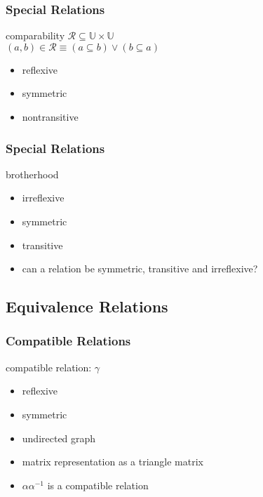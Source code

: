 \documentclass[dvipsnames]{beamer}
\begin{document}
\begin{frame}
  \frametitle{Special Relations}

  \begin{block}{comparability}
    $\mathcal{R} \subseteq \mathbb{U} \times \mathbb{U}$\\
    $(a,b) \in \mathcal{R} \equiv (a \subseteq b) \vee (b \subseteq a)$

    \medskip
    \begin{itemize}
      \item reflexive
      \item symmetric
      \item nontransitive
    \end{itemize}
  \end{block}
\end{frame}

\begin{frame}
  \frametitle{Special Relations}

  \begin{block}{brotherhood}
    \begin{itemize}
      \item irreflexive
      \item symmetric
      \item transitive
    \end{itemize}

    \pause
    \medskip
    \begin{itemize}
      \item can a relation be symmetric, transitive and irreflexive?
    \end{itemize}
  \end{block}
\end{frame}

\subsection{Equivalence Relations}

\begin{frame}
  \frametitle{Compatible Relations}

  \begin{definition}
    \alert{compatible relation}: $\gamma$
    \begin{itemize}
      \item reflexive
      \item symmetric
    \end{itemize}
  \end{definition}

  \pause
  \begin{itemize}
    \item undirected graph
    \item matrix representation as a triangle matrix
  \end{itemize}

  \pause
  \begin{itemize}
    \item $\alpha \alpha^{-1}$ is a compatible relation
  \end{itemize}
\end{frame}
\end{document}
